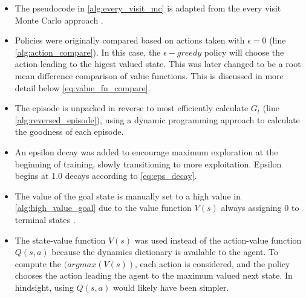 \documentclass[letterpaper]{article} %
\begin{document}
	\begin{itemize}
	    \item The pseudocode in \ref{alg:every_visit_mc} is adapted from the every visit Monte Carlo approach \cite{SuttonBartoRLBook}.
	    \item Policies were originally compared based on actions taken with $\epsilon=0$ (line \ref{alg:action_compare}). In this case, the $\epsilon-greedy$ policy will choose the action leading to the higest valued state. This was later changed to be a root mean difference comparison of value functions. This is discussed in more detail below \ref{eq:value_fn_compare}.
	    \item The episode is unpacked in reverse to most efficiently calculate $G_t$ (line \ref{alg:reversed_episode}), using a dynamic programming approach to calculate the goodness of each episode.
	    \item An epsilon decay was added to encourage maximum exploration at the beginning of training, slowly transitioning to more exploitation. Epsilon begins at 1.0 decays according to \ref{eq:eps_decay}.
	    \item The value of the goal state is manually set to a high value in \ref{alg:high_value_goal} due to the value function $V(s)$ always assigning 0 to terminal states \cite{Morales2020GrokkingDL}.
	    \item The state-value function $V(s)$ was used instead of the action-value function $Q(s,a)$ because the dynamics dictionary is available to the agent. To compute the $(argmax(V(s))$, each action is considered, and the policy chooses the action leading the agent to the maximum valued next state. In hindsight, using $Q(s,a)$ would likely have been simpler.
	\end{itemize}
\end{document}
